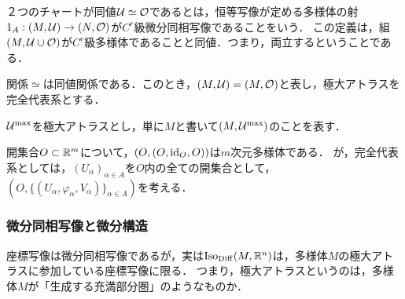 \documentclass[uplatex,dvipdfmx]{jsreport}
\begin{document}
\begin{definition}
    ２つのチャートが同値$\mathcal{U}\simeq\mathcal{O}$であるとは，恒等写像が定める多様体の射$1_A:(M,\mathcal{U})\to(N,\mathcal{O})$が$C^r$級微分同相写像であることをいう．
    この定義は，組$(M,\mathcal{U}\cup\mathcal{O})$が$C^r$級多様体であることと同値．つまり，両立するということである．
\end{definition}

\begin{lemma}
    関係$\simeq$は同値関係である．このとき，$(M,\mathcal{U})=(M,\mathcal{O})$と表し，極大アトラスを完全代表系とする．
\end{lemma}

\begin{definition}
    $\mathcal{U}^\mathrm{max}$を極大アトラスとし，単に$M$と書いて$(M,\mathcal{U}^\mathrm{max})$のことを表す．
\end{definition}

\begin{example}
    開集合$O\subset\mathbb{R}^m$について，$(O,(O,\mathrm{id}_O,O))$は$m$次元多様体である．
    が，完全代表系としては，$(U_\alpha)_{\alpha\in A}$を$O$内の全ての開集合として，$(O,\{(U_\alpha,\varphi_\alpha,V_\alpha)\}_{\alpha\in A})$を考える．
\end{example}

\subsubsection{微分同相写像と微分構造}

\begin{tcolorbox}[colframe=ForestGreen, colback=ForestGreen!10!white,breakable,colbacktitle=ForestGreen!40!white,coltitle=black,fonttitle=\bfseries\sffamily,
title=多様体の座標関数を特徴づけることができる]
    座標写像は微分同相写像であるが，実は$\mathrm{Iso}_{\mathrm{Diff}}(M,\mathbb{R}^n)$は，多様体$M$の極大アトラスに参加している座標写像に限る．
    つまり，極大アトラスというのは，多様体$M$が「生成する充満部分圏」のようなものか．
\end{tcolorbox}
\end{document}
